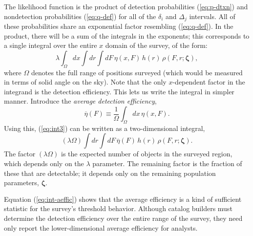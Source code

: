 \documentclass[12pt]{article}
\numberwithin{equation}{section}
\numberwithin{figure}{section}
\numberwithin{table}{section}
\newcommand{\rhopar}{\boldsymbol{\zeta}}
\newcommand{\effic}{\eta}
\newcommand{\aeffic}{\overline{\eta}}
\begin{document}
The likelihood function is the product of detection probabilities (\ref{eq:p-dtxn}) and nondetection probabilities (\ref{eq:q-def}) for all of the $\delta_i$ and $\Delta_j$ intervals.
All of these probabilities share an exponential factor resembling (\ref{eq:q-def}).
In the product, there will be a sum of the integrals in the exponents; this corresponds to a single integral over the entire $x$ domain of the survey, of the form:
\begin{equation}\label{eq:int3}
\lambda\int_\Omega dx \int dr \int dF\,\effic(x,F)\, h(r)\, \rho(F,r;\rhopar),
\end{equation}
where $\Omega$ denotes the full range of positions surveyed (which would be measured in terms of solid angle on the sky).
Note that the only $x$-dependent factor in the integrand is the detection efficiency.
This lets us write the integral in simpler manner.
Introduce the \emph{average detection efficiency},
\begin{equation}\label{eq:aeffic}
\aeffic(F) \equiv \frac{1}{\Omega} \int_\Omega dx \,\effic(x,F).
\end{equation}
Using this, (\ref{eq:int3}) can be written as a two-dimensional integral,
\begin{equation}\label{eq:int-aeffic}
(\lambda \Omega) \int dr \int dF\,\aeffic(F)\, h(r)\, \rho(F,r;\rhopar).
\end{equation}
The factor $(\lambda \Omega)$ is the expected number of objects in the surveyed region, which depends only on the $\lambda$ parameter.
The remaining factor is the fraction of these that are detectable; it depends only on the remaining population parameters, $\rhopar$.

Equation (\ref{eq:int-aeffic}) shows that the average efficiency is a kind of sufficient statistic for the survey's threshold behavior.
Although catalog builders must determine the detection efficiency over the entire range of the survey, they need only report the lower-dimensional average efficiency for analysts.
\end{document}
